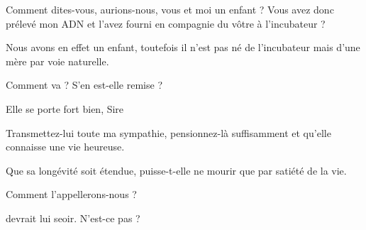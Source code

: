 \begin{drama}
  \elaspeaks Comment dites-vous, aurions-nous, vous et moi un enfant ? Vous avez donc prélevé mon ADN et l’avez fourni en compagnie du vôtre à l’incubateur ?

  \elenaspeaks Nous avons en effet un enfant, toutefois il n’est pas né de l’incubateur mais d’une mère par voie naturelle.



  \elenaspeaks {} Comment va \catin ? S’en est-elle remise ?

  \alexasspeaks Elle se porte fort bien, Sire

  \elenaspeaks Transmettez-lui toute ma sympathie, pensionnez-là suffisamment et qu’elle connaisse une vie heureuse. 

  \alexasspeaks Que sa longévité soit étendue, puisse-t-elle ne mourir que par satiété de la vie.

  \elaspeaks Comment l’appellerons-nous ?

  \elenaspeaks \cleopatre devrait lui seoir. N’est-ce pas \cleopatre ?

\end{drama}

\scene

\StageDirII{\elena, \ela, \alexas, \cleopatre, \nobleOne, \nobleTwo, \nobleTree, \pretre, \huissier, \peuple, \darius, \dariussuite}


